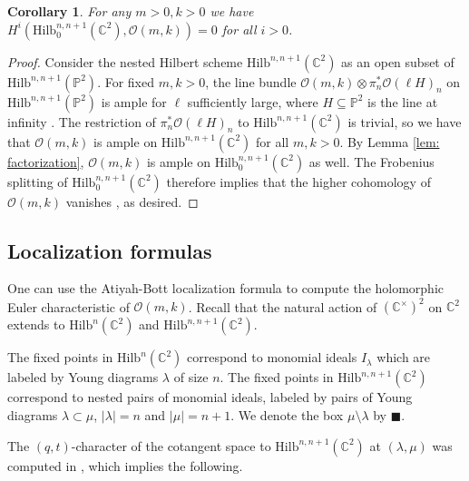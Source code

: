 \documentclass[12pt]{amsart}
\newcommand{\Hilb}{\mathrm{Hilb}}
\newcommand{\C}{\mathbb{C}}
\renewcommand{\P}{\mathbb{P}}
\newcommand{\CO}{\mathcal{O}}
\numberwithin{equation}{section}
\newtheorem{proposition}[theorem]{Proposition}
\newtheorem{corollary}[theorem]{Corollary}
\theoremstyle{definition}
\newcommand{\bsq}{\blacksquare}
\begin{document}
\begin{corollary}
\label{cor:vanishing}
  For any \(m>0, k>0\) we have \(H^i(\Hilb^{n,n+1}_0(\C^2),\CO(m,k))=0\) for all \(i>0\).
\end{corollary}

\begin{proof}
    Consider the nested Hilbert scheme $\Hilb^{n,n+1}(\C^2)$ as an open subset of $\Hilb^{n,n+1}(\P^2)$. For fixed $m,k>0$, the line bundle $\CO(m,k)\otimes \pi_n^*\CO(\ell H)_n$ on $\Hilb^{n,n+1}(\P^2)$ is ample for $\ell$ sufficiently large, where $H\subseteq \P^2$ is the line at infinity \cite{Ryan}. The restriction of $\pi_n^*\CO(\ell H)_n$ to $\Hilb^{n,n+1}(\C^2)$ is trivial, so we have that $\CO(m,k)$ is ample on $\Hilb^{n,n+1}(\C^2)$ for all $m,k>0$. By Lemma \ref{lem: factorization}, $\CO(m,k)$ is ample on $\Hilb^{n,n+1}_0(\C^2)$ as well. The Frobenius splitting of $\Hilb^{n,n+1}_0(\C^2)$ therefore implies that the higher cohomology of $\CO(m,k)$ vanishes \cite{BrionKumar}, as desired.
\end{proof}

 


\subsection{Localization formulas}



One can use the Atiyah-Bott localization formula to compute the holomorphic Euler characteristic of $\CO(m,k)$. Recall that the natural action of $(\C^{\times})^2$ on $\C^2$ extends to $\Hilb^n(\C^2)$ and $\Hilb^{n,n+1}(\C^2)$.

The fixed points in $\Hilb^n(\C^2)$ correspond to monomial ideals $I_{\lambda}$ which are labeled by Young diagrams $\lambda$ of size $n$. The fixed points in $\Hilb^{n,n+1}(\C^2)$ correspond to nested pairs of monomial ideals, labeled by pairs of Young diagrams $\lambda\subset \mu$, $|\lambda|=n$ and $|\mu|=n+1$. We denote the box $\mu\setminus\lambda$ by $\bsq$.

The $(q,t)$-character of the cotangent space to $\Hilb^{n,n+1}(\C^2)$ at $(\lambda,\mu)$ was computed  in \cite{Can,Cheah}, which implies the following.
\end{document}
